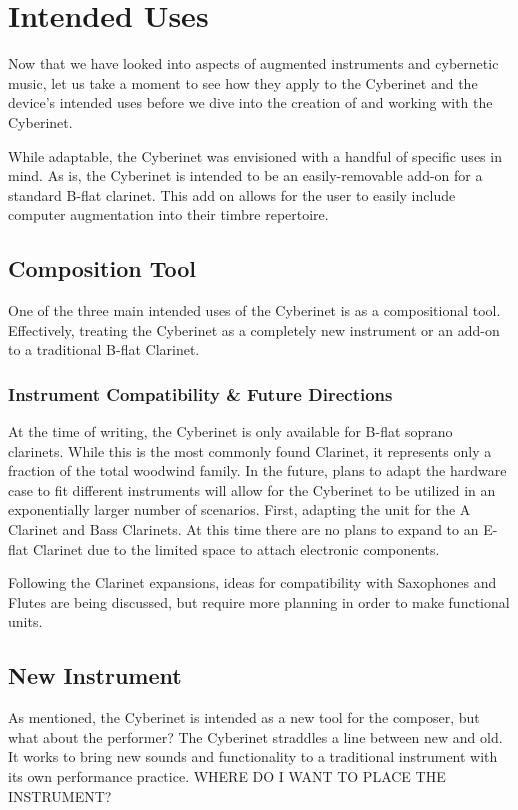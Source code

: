 \chapter{Intended Uses} %
Now that we have looked into aspects of augmented instruments and cybernetic music, let us take a moment to see how they apply to the Cyberinet and the device's intended uses before we dive into the creation of and working with the Cyberinet.

While adaptable, the Cyberinet was envisioned with a handful of specific uses in mind. As is, the Cyberinet is intended to be an easily-removable add-on for a standard B-flat clarinet. This add on allows for the user to easily include computer augmentation into their timbre repertoire. 

\section{Composition Tool}
One of the three main intended uses of the Cyberinet is as a compositional tool. Effectively, treating the Cyberinet as a completely new instrument or an add-on to a traditional B-flat Clarinet.

\subsection{Instrument Compatibility \& Future Directions}
At the time of writing, the Cyberinet is only available for B-flat soprano clarinets. While this is the most commonly found Clarinet, it represents only a fraction of the total woodwind family. In the future, plans to adapt the hardware case to fit different instruments will allow for the Cyberinet to be utilized in an exponentially larger number of scenarios. 
First, adapting the unit for the A Clarinet and Bass Clarinets. At this time there are no plans to expand to an E-flat Clarinet due to the limited space to attach electronic components.

Following the Clarinet expansions, ideas for compatibility with Saxophones and Flutes are being discussed, but require more planning in order to make functional units.

\section{New Instrument}

As mentioned, the Cyberinet is intended as a new tool for the composer, but what about the performer? The Cyberinet straddles a line between new and old. It works to bring new sounds and functionality to a traditional instrument with its own performance practice. WHERE DO I WANT TO PLACE THE INSTRUMENT? 

